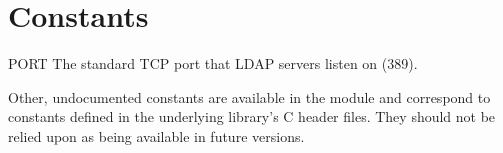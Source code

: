 \section{Constants}


\begin{datadesc}{PORT}
The standard TCP port that LDAP servers listen on (389).
\end{datadesc}


Other, undocumented constants are available in the module and
correspond to constants defined in the underlying library's
C header files.
They should not be relied upon as being available in future versions.
